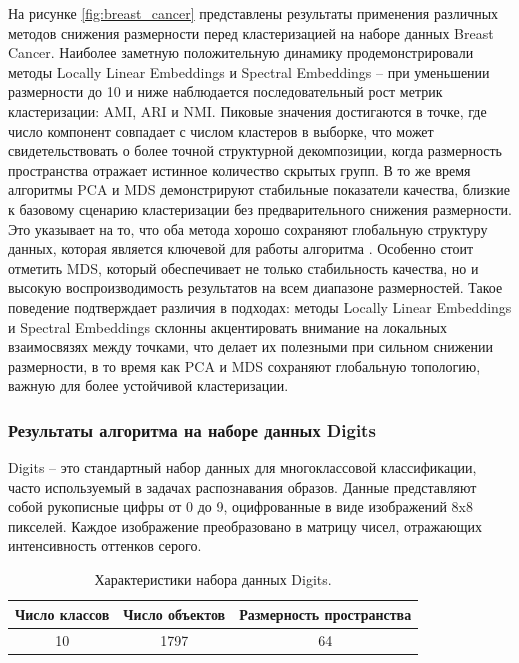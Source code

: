             На рисунке \ref{fig:breast_cancer} представлены результаты применения различных методов снижения размерности перед кластеризацией \kmeans{} на наборе данных Breast Cancer. Наиболее заметную положительную динамику продемонстрировали методы Locally Linear Embeddings и Spectral Embeddings -- при уменьшении размерности до 10 и ниже наблюдается последовательный рост метрик кластеризации: AMI, ARI и NMI. Пиковые значения достигаются в точке, где число компонент совпадает с числом кластеров в выборке, что может свидетельствовать о более точной структурной декомпозиции, когда размерность пространства отражает истинное количество скрытых групп. В то же время алгоритмы PCA и MDS демонстрируют стабильные показатели качества, близкие к базовому сценарию кластеризации без предварительного снижения размерности. Это указывает на то, что оба метода хорошо сохраняют глобальную структуру данных, которая является ключевой для работы алгоритма \kmeans{}. Особенно стоит отметить MDS, который обеспечивает не только стабильность качества, но и высокую воспроизводимость результатов на всем диапазоне размерностей. Такое поведение подтверждает различия в подходах: методы Locally Linear Embeddings и Spectral Embeddings склонны акцентировать внимание на локальных взаимосвязях между точками, что делает их полезными при сильном снижении размерности, в то время как PCA и MDS сохраняют глобальную топологию, важную для более устойчивой кластеризации.

        \subsubsection{Результаты алгоритма на наборе данных Digits}
            Digits -- это стандартный набор данных для многоклассовой классификации, часто используемый в задачах распознавания образов. Данные представляют собой рукописные цифры от 0 до 9, оцифрованные в виде изображений 8x8 пикселей. Каждое изображение преобразовано в матрицу чисел, отражающих интенсивность оттенков серого.

            \begin{table}[H]
                \centering
                \caption{Характеристики набора данных Digits.}
                \begin{tabular}{ccc}
                    \toprule
                    Число классов & Число объектов & Размерность пространства \\
                    \midrule
                    10 & 1797 & 64 \\
                    \bottomrule
                \end{tabular}
            \end{table}

